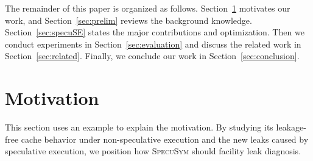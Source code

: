 \documentclass[sigconf]{acmart}
\newcommand{\SpecuSym}{\textsc{SpecuSym} }
\begin{document}
The remainder of this paper is organized as follows. Section~\ref{sec:mtv} 
motivates our work, and Section~\ref{sec:prelim} reviews the background 
knowledge. Section~\ref{sec:specuSE} states the major contributions and
optimization. Then we conduct experiments in Section~\ref{sec:evaluation} 
and discuss the related work in Section~\ref{sec:related}. Finally, we 
conclude our work in Section~\ref{sec:conclusion}.


\section{Motivation}
\label{sec:mtv}

This section uses an example to explain the motivation. By studying its 
leakage-free cache behavior under non-speculative execution and the new 
leaks caused by speculative execution, we position how \SpecuSym should
facility leak diagnosis.
\end{document}
